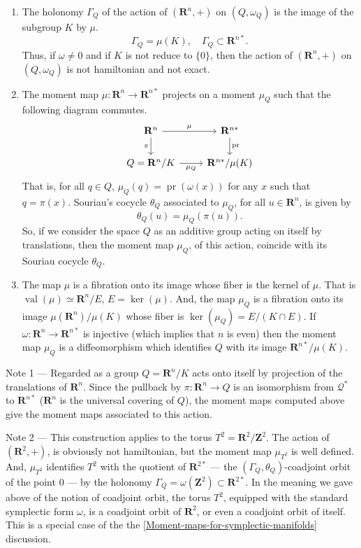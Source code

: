 \documentclass[10pt,reqno,twoside]{amsart}
\newcommand{\RR}{\mathbf{R}}
\newcommand{\ZZ}{\mathbf{Z}}
\newcommand{\cQ}{\mathcal{Q}}
\renewcommand{\ZZ}{\mathbf{Z}}
\DeclareMathOperator{\pr}{pr}
\DeclareMathOperator{\Values}{val}
\newcommand{\T}{T}
\newcommand{\E}{E}
\theoremstyle{plain}
\theoremstyle{definition}
\begin{document}
  \begin{enumerate}
    \item The holonomy $\Gamma_Q$ of the action of $(\RR^n,+)$ on $(Q,\omega_Q)$ is the image of the subgroup $K$ by $\mu$.
    $$
      \Gamma_Q = \mu(K), \quad \Gamma_Q \subset \RR^{n*}.
      $$
    Thus, if $\omega \neq 0$ and if $K$ is not reduce to $\{0\}$, then the action of $(\RR^n,+)$ on $(Q,\omega_Q)$ is not hamiltonian and not exact.
    \item The moment map $\mu : \RR^n \to \RR^{n*}$ projects on a moment $\mu_Q$ such that the following diagram commutes.
    \[
    \begin{tikzcd}
      \RR^n \arrow[r, "\mu"] \arrow[d, "\pi"'] & \RR^{n*} \arrow[d, "\pr"] \\
      Q = \RR^n/K \arrow[r, "\mu_Q"'] & \RR^{n*}/\mu(K)
    \end{tikzcd}
    \]
    That is, for all $q \in Q$, $\mu_Q(q) = \pr(\omega(x))$ for any $x$ such that $q = \pi(x)$. Souriau's cocycle $\theta_Q$ associated to $\mu_Q$, for all $u \in \RR^n$, is given by
    $$
      \theta_Q(u) = \mu_Q(\pi(u)).
      $$
    So, if we consider the space $Q$ as an additive group acting on itself by translations, then the moment map $\mu_Q$, of this action, coincide with its Souriau cocycle $\theta_Q$.
    \item The map $\mu$ is a fibration onto its image whose fiber is the kernel of $\mu$. That is $\Values(\mu) \simeq \RR^n/\E$, $\E = \ker(\mu)$. And, the map $\mu_Q$ is a fibration onto its image $\mu(\RR^n)/\mu(K)$ whose fiber is $\ker(\mu_Q) = \E/(K \cap \E)$. If $\omega: \RR^n \to \RR^{n*}$ is injective (which implies that $n$ is even) then the moment map $\mu_Q$ is a diffeomorphism which identifies $Q$ with its image $\RR^{n*}\!/\mu(K)$.
  \end{enumerate}
  {\sc Note 1} --- Regarded as a group $Q = \RR^n\!/{K}$ acts onto itself by projection of the translations of $\RR^n$.
  Since the pullback by $\pi: \RR^n \to Q$ is an isomorphism from $\cQ^*$ to $\RR^{n*}$ ($\RR^n$ is the universal covering of $Q$),
  the moment maps computed above give the moment maps associated to this action.
  
  {\sc Note 2} --- This construction applies to the torus $\T^2 = \RR^2/\ZZ^2$.
  The action of $(\RR^2,+)$,
  is obviously not hamiltonian,
  but the moment map $\mu_{\T^2}$ is well defined.
  And,
  $\mu_{\T^2}$ identifies $\T^2$ with the quotient of $\RR^{2*}$ --- the $(\Gamma_Q,\theta_Q)$-coadjoint orbit of the point $0$ --- by the holonomy $\Gamma_Q = \omega(\ZZ^2) \subset \RR^{2*}$.
  In the meaning we gave above of the notion of coadjoint orbit,
  the torus $\T^2$,
  equipped with the standard symplectic form $\omega$,
  is a coadjoint orbit of $\RR^2$,
  or even a coadjoint orbit of itself.
  This is a special case of the the \ref{Moment-maps-for-symplectic-manifolds} discussion.
  
\end{document}
